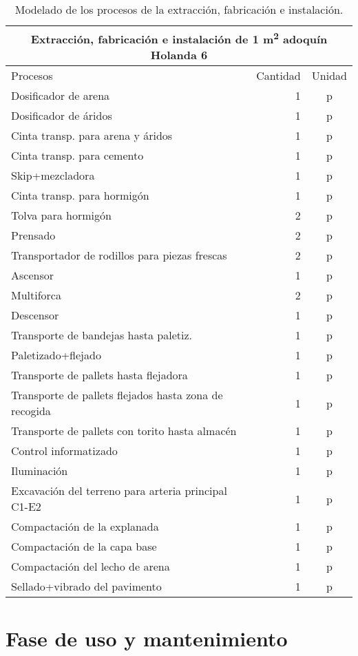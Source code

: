 \begin{table}[!htp]
\centering
\begin{tabular}{p{8cm}rc}
\toprule
\multicolumn{3}{c}{Extracción, fabricación e instalación de 1 \si{m^2} adoquín Holanda 6}\\
\midrule
Procesos & Cantidad & Unidad\\
\midrule
Dosificador de arena & 1 & p\\
Dosificador de áridos & 1 & p\\
Cinta transp. para arena y áridos & 1 & p\\
Cinta transp. para cemento & 1 & p\\
Skip+mezcladora & 1 & p\\
Cinta transp. para hormigón & 1 & p\\
Tolva para hormigón & 2 & p\\
Prensado & 2 & p\\
Transportador de rodillos para piezas frescas & 2 & p\\
Ascensor & 1 & p\\
Multiforca & 2 & p\\
Descensor & 1 & p\\
Transporte de bandejas hasta paletiz. & 1 & p\\
Paletizado+flejado & 1 & p\\
Transporte de pallets hasta flejadora & 1 & p\\
Transporte de pallets flejados hasta zona de recogida & 1 & p\\
Transporte de pallets con torito hasta almacén & 1 & p\\
Control informatizado & 1 & p\\
Iluminación & 1 & p\\
Excavación del terreno para arteria principal C1-E2 & 1 & p\\
Compactación de la explanada & 1 & p\\
Compactación de la capa base & 1 & p\\
Compactación del lecho de arena & 1 & p\\
Sellado+vibrado del pavimento & 1 & p\\
\bottomrule
\end{tabular}
\caption{Modelado de los procesos de la extracción, fabricación e instalación.}
\label{modeladocompletofabricacionprocesos}
\end{table}

\section{Fase de uso y mantenimiento}\label{sec:faseusoymantenimiento}

